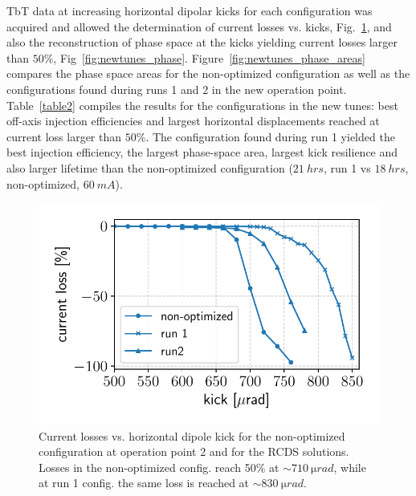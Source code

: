 \documentclass[a4paper,
               keeplastbox,   %
               ]{jacow}
\begin{document}
TbT data at increasing horizontal dipolar kicks for each configuration was acquired and allowed the determination of current losses vs. kicks, Fig.~\ref{fig:loss_kicks_newtunes}, and also the reconstruction of phase space at the kicks yielding current losses larger than $50\%$, Fig~\ref{fig:newtunes_phase}. Figure~\ref{fig:newtunes_phase_areas} compares the phase space areas for the non-optimized configuration as well as the configurations found during runs 1 and 2 in the new operation point. Table~\ref{table2} compiles the results for the configurations in the new tunes: best off-axis injection efficiencies and largest horizontal displacements reached at current loss larger than $50\%$. The configuration found during run 1 yielded the best injection efficiency, the largest phase-space area, largest kick resilience and also larger lifetime than the non-optimized configuration ($21~\unit{hrs}$, run 1 vs $18~\unit{hrs}$, non-optimized, $60~\unit{mA}$). 
\begin{figure}[!h]
   \includegraphics[width=\columnwidth]{new_tunes_kick_resilience.pdf}
   \caption{Current losses vs. horizontal dipole kick for the non-optimized configuration at operation point 2 and for the RCDS solutions. Losses in the non-optimized config. reach 50\% at $\sim710~\si{\micro rad}$, while at run 1 config. the same loss is reached at $\sim 830~\si{\micro rad}$.}
   \label{fig:loss_kicks_newtunes}
\end{figure}
\end{document}
